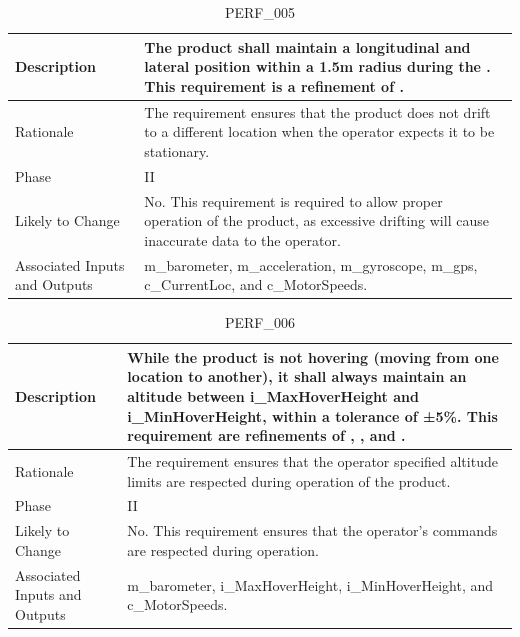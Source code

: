 \documentclass{article}
\begin{document}
\begin{table}[!h]
\begin{center}
\caption {PERF\_005} 
\label{PERF_005}
\begin{tabular}{ | m{3cm} | m{11cm} | }
\hline
Description & The product shall maintain a longitudinal and lateral position within a 1.5m radius during the \nameref{Hover State}. This requirement is a refinement of \nameref{STA_001}. \\
\hline
Rationale & The requirement ensures that the product does not drift to a different location when the operator expects it to be stationary. \\
\hline
Phase & II \\
\hline
Likely to Change & No. This requirement is required to allow proper operation of the product, as excessive drifting will cause inaccurate data to the operator. \\
\hline
Associated Inputs and Outputs & m\_barometer, m\_acceleration, m\_gyroscope, m\_gps, c\_CurrentLoc, and c\_MotorSpeeds.  \\
\hline
\end{tabular}
\end{center}
\end{table}

\begin{table}[!h]
\begin{center}
\caption {PERF\_006} 
\label{PERF_006}
\begin{tabular}{ | m{3cm} | m{11cm} | }
\hline
Description & While the product is not hovering (moving from one location to another), it shall always maintain an altitude between i\_MaxHoverHeight and i\_MinHoverHeight, within a tolerance of ±5\%. This requirement are refinements of \nameref{STA_001}, \nameref{STA_002}, \nameref{STA_011} and \nameref{STA_003}.  \\
\hline
Rationale & The requirement ensures that the operator specified altitude limits are respected during operation of the product. \\
\hline
Phase & II \\
\hline
Likely to Change & No. This requirement ensures that the operator's commands are respected during operation. \\
\hline
Associated Inputs and Outputs & m\_barometer, i\_MaxHoverHeight, i\_MinHoverHeight, and c\_MotorSpeeds.  \\
\hline
\end{tabular}
\end{center}
\end{table}
\end{document}
